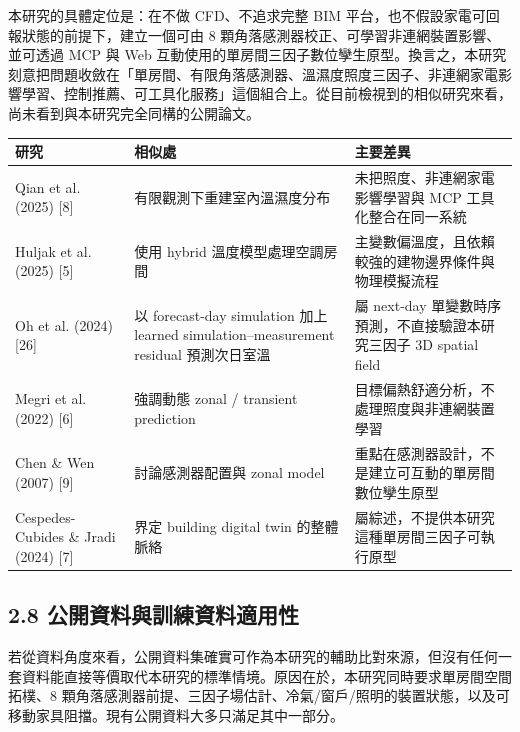 \documentclass[12pt,a4paper]{article}
\begin{document}
本研究的具體定位是：在不做 CFD、不追求完整 BIM 平台，也不假設家電可回報狀態的前提下，建立一個可由 8 顆角落感測器校正、可學習非連網裝置影響、並可透過 MCP 與 Web 互動使用的單房間三因子數位孿生原型。換言之，本研究刻意把問題收斂在「單房間、有限角落感測器、溫濕度照度三因子、非連網家電影響學習、控制推薦、可工具化服務」這個組合上。從目前檢視到的相似研究來看，尚未看到與本研究完全同構的公開論文。


\begin{table}[htbp]
\centering
\footnotesize
\renewcommand{\arraystretch}{1.25}
\begin{tabular}{|>{\raggedright\arraybackslash}p{}|>{\raggedright\arraybackslash}p{}|>{\raggedright\arraybackslash}p{}|}
\hline
\textbf{研究} & \textbf{相似處} & \textbf{主要差異} \\
\hline
Qian et al. (2025) [8] & 有限觀測下重建室內溫濕度分布 & 未把照度、非連網家電影響學習與 MCP 工具化整合在同一系統 \\
\hline
Huljak et al. (2025) [5] & 使用 hybrid 溫度模型處理空調房間 & 主變數偏溫度，且依賴較強的建物邊界條件與物理模擬流程 \\
\hline
Oh et al. (2024) [26] & 以 forecast-day simulation 加上 learned simulation--measurement residual 預測次日室溫 & 屬 next-day 單變數時序預測，不直接驗證本研究三因子 3D spatial field \\
\hline
Megri et al. (2022) [6] & 強調動態 zonal / transient prediction & 目標偏熱舒適分析，不處理照度與非連網裝置學習 \\
\hline
Chen \& Wen (2007) [9] & 討論感測器配置與 zonal model & 重點在感測器設計，不是建立可互動的單房間數位孿生原型 \\
\hline
Cespedes-Cubides \& Jradi (2024) [7] & 界定 building digital twin 的整體脈絡 & 屬綜述，不提供本研究這種單房間三因子可執行原型 \\
\hline
\end{tabular}
\end{table}

\subsection*{2.8 公開資料與訓練資料適用性}

若從資料角度來看，公開資料集確實可作為本研究的輔助比對來源，但沒有任何一套資料能直接等價取代本研究的標準情境。原因在於，本研究同時要求單房間空間拓樸、8 顆角落感測器前提、三因子場估計、冷氣/窗戶/照明的裝置狀態，以及可移動家具阻擋。現有公開資料大多只滿足其中一部分。
\end{document}
